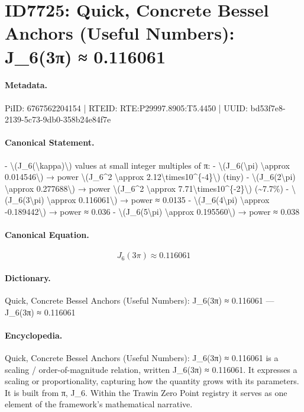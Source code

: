 \section*{ID7725: Quick, Concrete Bessel Anchors (Useful Numbers): J\_6(3π) ≈ 0.116061}
\paragraph{Metadata.}
PiID: 6767562204154 | RTEID: RTE:P29997.8905:T5.4450 | UUID: bd53f7e8-2139-5c73-9db0-358b24e84f7e

\paragraph{Canonical Statement.}
- \textbackslash{}(J\_6(\textbackslash{}kappa)\textbackslash{}) values at small integer multiples of π: - \textbackslash{}(J\_6(\textbackslash{}pi) \textbackslash{}approx 0.014546\textbackslash{}) → power \textbackslash{}(J\_6\textasciicircum{}2 \textbackslash{}approx 2.12\textbackslash{}times10\textasciicircum{}\{-4\}\textbackslash{}) (tiny) - \textbackslash{}(J\_6(2\textbackslash{}pi) \textbackslash{}approx 0.277688\textbackslash{}) → power \textbackslash{}(J\_6\textasciicircum{}2 \textbackslash{}approx 7.71\textbackslash{}times10\textasciicircum{}\{-2\}\textbackslash{}) (\textasciitilde{}7.7\%) - \textbackslash{}(J\_6(3\textbackslash{}pi) \textbackslash{}approx 0.116061\textbackslash{}) → power ≈ 0.0135 - \textbackslash{}(J\_6(4\textbackslash{}pi) \textbackslash{}approx -0.189442\textbackslash{}) → power ≈ 0.036 - \textbackslash{}(J\_6(5\textbackslash{}pi) \textbackslash{}approx 0.195560\textbackslash{}) → power ≈ 0.038

\paragraph{Canonical Equation.}
\[
J_6(3\pi) \approx 0.116061
\]

\paragraph{Dictionary.}
Quick, Concrete Bessel Anchors (Useful Numbers): J\_6(3π) ≈ 0.116061 — J\_6(3π) ≈ 0.116061

\paragraph{Encyclopedia.}
Quick, Concrete Bessel Anchors (Useful Numbers): J\_6(3π) ≈ 0.116061 is a scaling / order-of-magnitude relation, written J\_6(3π) ≈ 0.116061. It expresses a scaling or proportionality, capturing how the quantity grows with its parameters. It is built from π, J\_6. Within the Trawin Zero Point registry it serves as one element of the framework's mathematical narrative.
